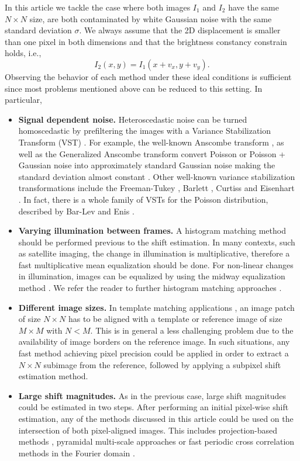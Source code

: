 In this article we tackle the case where both images $I_1$ and $I_2$ have the same $N \times N$ size, are both contaminated by white Gaussian noise with the same standard deviation $\sigma$. We always assume that the 2D displacement is smaller than one pixel in both dimensions and that the brightness constancy constrain holds, i.e.,
\begin{equation}
I_2(x,y) = I_1(x+v_x,y+v_y).
\end{equation}
Observing the behavior of each method under these ideal conditions is sufficient since most problems mentioned above can be reduced to this setting. In particular, 
\begin{itemize}
\item \textbf{Signal dependent noise.} Heteroscedastic noise can be turned homoscedastic by prefiltering the images with a Variance Stabilization Transform (VST) \cite{Starck_1998}. For example, the well-known Anscombe transform \cite{AnscombeVST}, as well as the Generalized Anscombe transform convert Poisson or Poisson + Gaussian noise into approximately standard Gaussian noise making the standard deviation almost constant \cite{Starck_1998}. Other well-known variance stabilization transformations include the Freeman-Tukey \cite{freeman1950}, Barlett \cite{Bartlett36}, Curtiss \cite{Curtiss43} and Eisenhart \cite{Eisenhart47}. In fact, there is a whole family of VSTs for the Poisson distribution, described by Bar-Lev and Enis \cite{barlev88}. 
\item \textbf{Varying illumination between frames.} A histogram matching method should be performed previous to the shift estimation. In many contexts, such as satellite imaging, the change in illumination is multiplicative, therefore a fast multiplicative mean equalization should be done. For non-linear changes in illumination, images can be equalized by using the midway equalization method \cite{Delon2004}. We refer the reader to further histogram matching approaches \cite{gonzalez2008digital, Maini2010}.

\item \textbf{Different image sizes.} In template matching applications \cite{brunelli2009template}, an image patch of size $N \times N$ has to be aligned with a template or reference image of size $M \times M$ with $N < M$. This is in general a less challenging problem due to the availability of image borders on the reference image. In such situations, any fast method achieving pixel precision \cite{adams2008viewfinder, Pham2012} could be applied in order to extract a $N \times N$ subimage from the reference, followed by applying a subpixel shift estimation method.
\item \textbf{Large shift magnitudes.}  As in the previous case, large shift magnitudes could be estimated in two steps. After performing an initial pixel-wise shift estimation, any of the methods discussed in this article could be used on the intersection of both pixel-aligned images. This includes projection-based methods \cite{adams2008viewfinder, Pham2012}, pyramidal multi-scale approaches \cite{Thevenaz1998, RaisMF15} or fast periodic cross correlation methods in the Fourier domain \cite{poyneer2003scene}.
\end{itemize}

